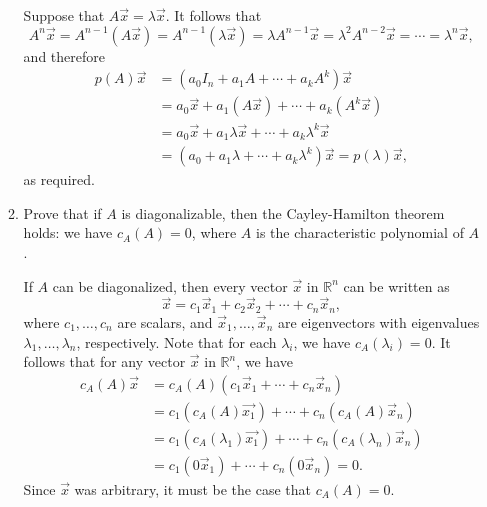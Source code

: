 \documentclass[letterpaper,12pt]{article}
\newcommand{\R}{\mathbb{R}}
\begin{document}
\begin{enumerate}
\begin{enumerate}
\bigskip

Suppose that $A\vec{x}=\lambda\vec{x}$. It follows that
\[
 A^n\vec{x} = A^{n-1}(A\vec{x}) = A^{n-1}(\lambda \vec{x}) = \lambda A^{n-1}\vec{x} = \lambda^2A^{n-2}\vec{x} = \cdots = \lambda^n\vec{x}, 
\]
and therefore
\begin{align*}
 p(A)\vec{x}&= (a_0I_n+a_1A+\cdots + a_kA^k)\vec{x}\\
& = a_0\vec{x}+a_1(A\vec{x})+\cdots + a_k(A^k\vec{x})\\
&=a_0\vec{x}+a_1\lambda\vec{x}+\cdots + a_k\lambda^k\vec{x}\\
&=(a_0+a_1\lambda+\cdots+a_k\lambda^k)\vec{x} = p(\lambda)\vec{x},
\end{align*}
as required.


 \item Prove that if $A$ is diagonalizable, then the Cayley-Hamilton theorem holds: we have $c_A(A)=0$, where $A$ is the characteristic polynomial of $A$.

\bigskip

If $A$ can be diagonalized, then every vector $\vec{x}$ in $\R^n$ can be written as
\[
 \vec{x} = c_1\vec{x}_1+c_2\vec{x}_2+\cdots +c_n\vec{x}_n,
\]
where $c_1,\ldots, c_n$ are scalars, and $\vec{x}_1,\ldots, \vec{x}_n$ are eigenvectors with eigenvalues $\lambda_1,\ldots, \lambda_n$, respectively. Note that for each $\lambda_i$, we have $c_A(\lambda_i)=0$. It follows that for any vector $\vec{x}$ in $\R^n$, we have
\begin{align*}
 c_A(A)\vec{x}&=c_A(A)(c_1\vec{x}_1+\cdots +c_n\vec{x}_n)\\
& = c_1(c_A(A)\vec{x_1})+\cdots + c_n(c_A(A)\vec{x}_n)\\
& = c_1(c_A(\lambda_1)\vec{x_1})+\cdots + c_n(c_A(\lambda_n)\vec{x}_n)\\
& = c_1(0\vec{x}_1)+\cdots + c_n(0\vec{x}_n) = 0.
\end{align*}
Since $\vec{x}$ was arbitrary, it must be the case that $c_A(A)=0$.

\end{enumerate}


\end{enumerate}
\end{document}
